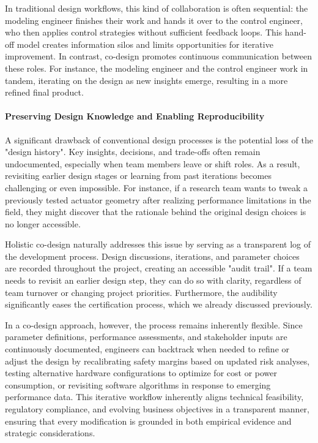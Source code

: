In traditional design workflows, this kind of collaboration is often sequential: the modeling engineer finishes their work and hands it over to the control engineer, who then applies control strategies without sufficient feedback loops. This hand-off model creates information silos and limits opportunities for iterative improvement. In contrast, co-design promotes continuous communication between these roles. For instance, the modeling engineer and the control engineer work in tandem, iterating on the design as new insights emerge, resulting in a more refined final product.

\paragraph{Preserving Design Knowledge and Enabling Reproducibility}
A significant drawback of conventional design processes is the potential loss of the "design history". Key insights, decisions, and trade-offs often remain undocumented, especially when team members leave or shift roles. As a result, revisiting earlier design stages or learning from past iterations becomes challenging or even impossible. For instance, if a research team wants to tweak a previously tested actuator geometry after realizing performance limitations in the field, they might discover that the rationale behind the original design choices is no longer accessible.

Holistic co-design naturally addresses this issue by serving as a transparent log of the development process. Design discussions, iterations, and parameter choices are recorded throughout the project, creating an accessible "audit trail". If a team needs to revisit an earlier design step, they can do so with clarity, regardless of team turnover or changing project priorities. Furthermore, the audibility significantly eases the certification process, which we already discussed previously.

In a co-design approach, however, the process remains inherently flexible. Since parameter definitions, performance assessments, and stakeholder inputs are continuously documented, engineers can backtrack when needed to refine or adjust the design by recalibrating safety margins based on updated risk analyses, testing alternative hardware configurations to optimize for cost or power consumption, or revisiting software algorithms in response to emerging performance data. This iterative workflow inherently aligns technical feasibility, regulatory compliance, and evolving business objectives in a transparent manner, ensuring that every modification is grounded in both empirical evidence and strategic considerations.